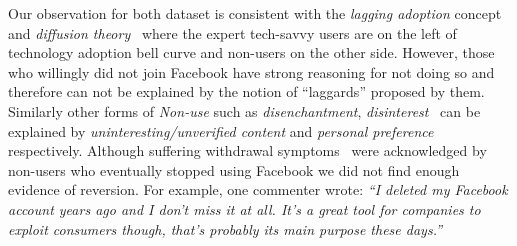 Our observation for both dataset is consistent with the \textit{lagging adoption} concept~\cite{satchell2009beyond} and \textit{diffusion theory}~\cite{selwyn2003apart} where the expert tech-savvy users are on the left of technology adoption bell curve and non-users on the other side. However, those who willingly did not join Facebook have strong reasoning for not doing so and therefore can not be explained by the notion of ``laggards'' proposed by them. Similarly other forms of \emph{Non-use} such as \textit{disenchantment}, \textit{disinterest}~\cite{satchell2009beyond} can be explained by \textit{uninteresting/unverified content} and \textit{personal preference} respectively. Although suffering withdrawal symptoms~\cite{baumer2015missing} were acknowledged by non-users who eventually stopped using Facebook we did not find enough evidence of reversion. For example, one commenter wrote: \textit{``I deleted my Facebook account years ago and I don't miss it at all. It's a great tool for companies to exploit consumers though, that's probably its main purpose these days.''}
 

\begin{comment}




\end{comment}

